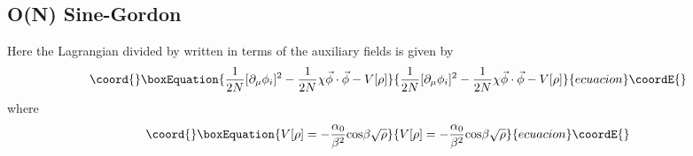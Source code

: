 \documentclass[a4paper,prd,preprint,superscriptaddress,showpacs,byrevtex]{revtex4}
\begin{document}
\subsection{O(N) Sine-Gordon}
Here the Lagrangian divided by \coordHE{} written in terms of the auxiliary fields
\myHighlight{$\chi,\rho$}\coordHE{}  is given by \begin{equation}\coord{}\boxEquation{
 \frac{1}{2 N} [
\partial_\mu \phi_i ]^2-
\frac{1}{2 N } \chi {\vec \phi \cdot \vec \phi}-  V[{\rho}]
}{
 \frac{1}{2 N} [
\partial_\mu \phi_i ]^2-
\frac{1}{2 N } \chi {\vec \phi \cdot \vec \phi}-  V[{\rho}]
}{ecuacion}\coordE{}\end{equation}
where
\begin{equation}\coord{}\boxEquation{ 
V[{\rho}]=-\frac{\alpha_0}{\beta^2} {\rm
cos} \beta \sqrt{\rho}
}{ 
V[{\rho}]=-\frac{\alpha_0}{\beta^2} {\rm
cos} \beta \sqrt{\rho}
}{ecuacion}\coordE{}\end{equation}
\end{document}
